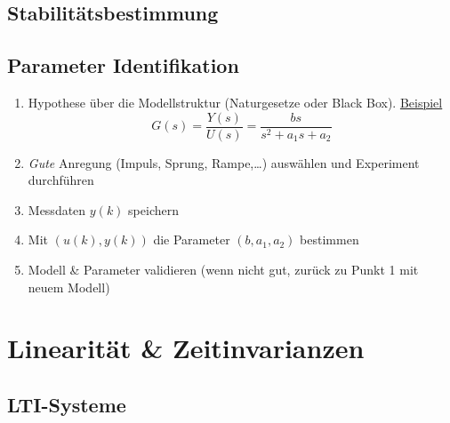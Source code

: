 \documentclass[
  10pt,
  a4paper,
  twocolumn]{article}
\newcommand{\VERB}{\Verb[commandchars=\\\{\}]}
\newcommand{\NormalTok}[1]{\textcolor[rgb]{0.14,0.16,0.18}{#1}}
\newcommand{\OperatorTok}[1]{\textcolor[rgb]{0.14,0.16,0.18}{#1}}
\newcommand{\VariableTok}[1]{\textcolor[rgb]{0.89,0.38,0.04}{#1}}
\providecommand{\tightlist}{%
  \setlength{\itemsep}{0pt}\setlength{\parskip}{0pt}}\usepackage{longtable,booktabs,array}
\numberwithin{equation}{section}
\begin{document}
\subsection{Stabilitätsbestimmung}\label{stabilituxe4tsbestimmung}


\subsection{Parameter Identifikation}\label{parameter-identifikation}

\begin{enumerate}
\def\labelenumi{\arabic{enumi}.}
\tightlist
\item
  Hypothese über die Modellstruktur (Naturgesetze oder Black Box).
  \ul{Beispiel} \[
  G(s)=\frac{Y(s)}{U(s)}=\frac{bs}{s^2+a_1s+a_2}
  \]
\item
  \emph{Gute} Anregung (Impuls, Sprung, Rampe,\ldots) auswählen und
  Experiment durchführen
\item
  Messdaten \(y(k)\) speichern
\item
  Mit \((u(k), y(k))\) die Parameter \((b, a_1, a_2)\) bestimmen
\item
  Modell \& Parameter validieren (wenn nicht gut, zurück zu Punkt 1 mit
  neuem Modell)
\end{enumerate}

\section{Linearität \&
Zeitinvarianzen}\label{linearituxe4t-zeitinvarianzen}

\subsection{LTI-Systeme}\label{lti-systeme}
\end{document}

